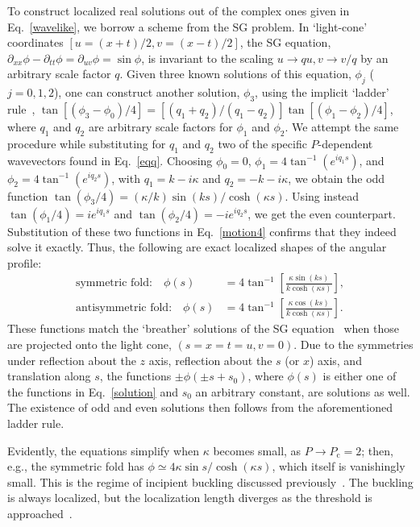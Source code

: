 \documentclass[prl,twocolumn,showpacs]{revtex4}
\begin{document}
To construct localized real solutions out of the complex ones given in
Eq.~\eqref{wavelike}, we borrow a scheme from the SG problem. In
`light-cone' coordinates $[u=(x+t)/2,v=(x-t)/2]$, the SG equation,
$\partial_{xx}\phi-\partial_{tt}\phi=\partial_{uv}\phi=\sin\phi$, is
invariant to the
scaling $u\rightarrow qu, v\rightarrow v/q$ by an arbitrary scale
factor $q$. Given three known solutions of this equation, $\phi_j$
($j=0,1,2$), one can construct another solution, $\phi_3$, using the
implicit `ladder' rule~\cite{Newell},
$\tan[(\phi_3-\phi_0)/4]=[(q_1+q_2)/(q_1-q_2)]\tan[(\phi_1-\phi_2)/4]$,
where $q_1$ and $q_2$ are arbitrary scale factors for $\phi_1$ and
$\phi_2$. We attempt the same procedure while substituting for $q_1$
and $q_2$ two of the specific $P$-dependent wavevectors found in
Eq.~\eqref{eqq}. Choosing $\phi_0=0$,
$\phi_1=4\tan^{-1}(e^{iq_1s})$, and
$\phi_2=4\tan^{-1}(e^{iq_2s})$, with $q_1=k-i\kappa$ and
$q_2=-k-i\kappa$, we obtain the odd function
$\tan(\phi_3/4)=(\kappa/k)\sin(ks)/\cosh(\kappa s)$. Using instead
$\tan(\phi_1/4)=ie^{iq_1s}$ and $\tan(\phi_2/4)=-ie^{iq_2s}$, we get
the even counterpart. Substitution of these two functions in
Eq.~\eqref{motion4} confirms that they indeed solve it exactly. Thus, the
following are exact localized shapes of the angular profile:
\begin{align}
  \text{symmetric fold:}\quad
  \phi(s)
  &= 4\tan^{-1}\left[
    \frac{\kappa\sin(ks)}{k\cosh(\kappa s)}
  \right],
  \nonumber\\
  \text{antisymmetric fold:}\quad
  \phi(s)
  &= 4\tan^{-1}\left[
    \frac{\kappa\cos(ks)}{k\cosh(\kappa s)}
  \right].
  \label{solution}
\end{align}
These functions match the `breather' solutions of the SG
equation~\cite{Infeld} when those are projected onto the light cone,
$(s=x=t=u,v=0)$. Due to the symmetries under reflection about the $z$
axis, reflection about the $s$ (or $x$) axis, and translation along
$s$, the functions $\pm\phi(\pm s+s_0)$, where $\phi(s)$ is either one
of the functions in Eq.~\eqref{solution} and $s_0$ an arbitrary
constant, are solutions as well. The existence of odd and even
solutions then follows from the aforementioned ladder rule.

Evidently, the equations simplify when $\kappa$ becomes small, as
$P\rightarrow P_{\mathrm{c}}=2$; then, e.g., the symmetric fold has
$\phi\simeq 4\kappa\sin s/\cosh(\kappa s)$, which itself is
vanishingly small. This is the regime of incipient buckling discussed
previously~\cite{Milner,CerdaMaha,ZhangWitten,DWpreprint,Audoly2011}. The
buckling is always localized, but the localization length diverges as
the threshold is approached~\cite{DWpreprint,Audoly2011}.
\end{document}
